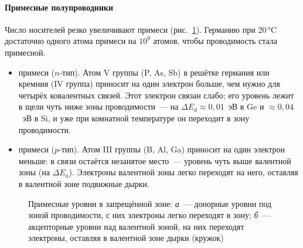 \paragraph{Примесные полупроводники}
Число носителей резко увеличивают примеси (рис.~\ref{fig:dopants}).
Германию при 20\,°C достаточно одного атома примеси на $10^9$ атомов,
чтобы проводимость стала примесной.
\begin{itemize}
\item {} примеси ($n$-тип). Атом V группы (P, As, Sb) в
решётке германия или кремния (IV группа) приносит на один электрон
больше, чем нужно для четырёх ковалентных связей. Этот электрон связан
слабо; его уровень лежит в щели чуть ниже зоны проводимости~— на
$\Delta E_d\approx0{,}01$~эВ в Ge и $\approx0{,}04$~эВ в Si, и уже при
комнатной температуре он переходит в зону проводимости.
\item {} примеси ($p$-тип). Атом III группы (B, Al, Ga)
приносит на один электрон меньше: в связи остаётся незанятое место~—
уровень чуть выше валентной зоны (на $\Delta E_a$). Электроны валентной
зоны легко переходят на него, оставляя в валентной зоне подвижные дырки.
\end{itemize}

\begin{figure}[ht]
\centering
{}
\caption{Примесные уровни в запрещённой зоне: \textit{а}~— донорные
уровни под зоной проводимости, с них электроны легко переходят в зону;
\textit{б}~— акцепторные уровни над валентной зоной, на них переходят
электроны, оставляя в валентной зоне дырки (кружок)}
\label{fig:dopants}
\end{figure}
